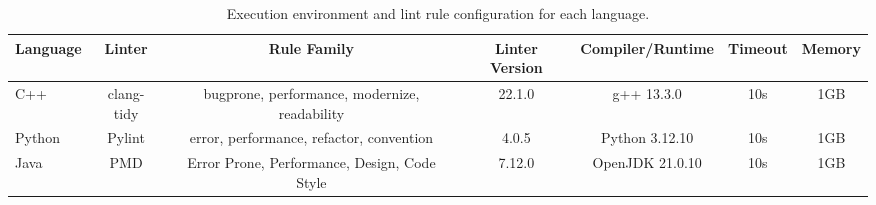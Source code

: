 \begin{table}[t]
\centering
\small
\begin{tabular}{lcccccc}
\toprule
\textbf{Language} & \textbf{Linter} & \textbf{Rule Family} & \textbf{Linter Version} & \textbf{Compiler/Runtime} & \textbf{Timeout} & \textbf{Memory} \\
\midrule
C++ & clang-tidy & bugprone, performance, modernize, readability & 22.1.0 & g++ 13.3.0 & 10s & 1GB \\
Python & Pylint & error, performance, refactor, convention & 4.0.5 & Python 3.12.10 & 10s & 1GB \\
Java & PMD & Error Prone, Performance, Design, Code Style & 7.12.0 & OpenJDK 21.0.10 & 10s & 1GB \\
\bottomrule
\end{tabular}

\caption{Execution environment and lint rule configuration for each language.}
\label{app:execution_env}
\end{table}
